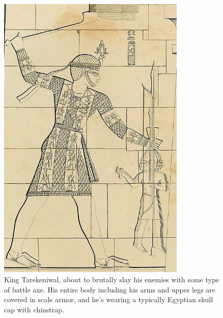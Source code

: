 \documentclass[a4paper,12pt]{scrreprt}
\begin{document}
\begin{figure}[H]
	\centering
	\includegraphics[width=0.8\textwidth]{img/king_tarekeniwal_slays_enemies}
	\caption{King Tarekeniwal, about to brutally slay his enemies with some type of battle axe. His entire body including his arms and upper legs are covered in scale armor, and he's wearing a typically Egyptian skull cap with chinstrap.}
\end{figure}
\end{document}
